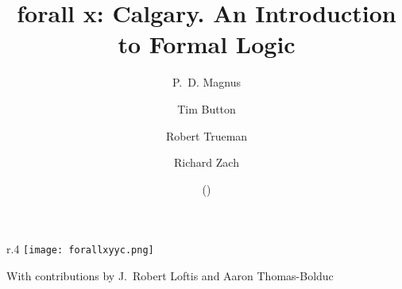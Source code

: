 \documentclass{book}
\title{forall x: Calgary. An Introduction to Formal Logic}
\author{P.~D. Magnus\and
Tim Button\and
Robert Trueman\and
Richard Zach}
\date{\forallxversion{} (\gitAuthorDate)}
\begin{document}
\begin{wrapfigure}{r}{.4\textwidth}
\texttt{[image: forallxyyc.png]}
\end{wrapfigure}

\maketitle

With contributions by J.~Robert Loftis and Aaron Thomas-Bolduc


\end{document}
